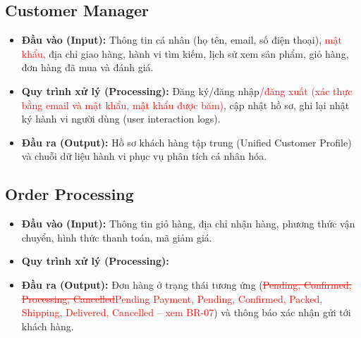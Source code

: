 \documentclass[12pt,a4paper,oneside]{report}
\newif\ifmark \marktrue
\newcommand{\chg}[1]{\ifmark\textcolor{red}{#1}\else #1\fi}
\newcommand{\del}[1]{\ifmark\textcolor{red}{\sout{#1}}\fi}
\begin{document}
\subsection{Customer Manager}

\begin{itemize}
  \item \textbf{Đầu vào (Input):} Thông tin cá nhân (họ tên, email, số điện thoại), \chg{mật khẩu, }địa chỉ giao hàng, hành vi tìm kiếm, lịch sử xem sản phẩm, giỏ hàng, đơn hàng đã mua và đánh giá.
  \item \textbf{Quy trình xử lý (Processing):} Đăng ký/đăng nhập\chg{/đăng xuất (xác thực bằng email và mật khẩu, mật khẩu được băm)}, cập nhật hồ sơ, ghi lại nhật ký hành vi người dùng (user interaction logs).
  \item \textbf{Đầu ra (Output):} Hồ sơ khách hàng tập trung (Unified Customer Profile) và chuỗi dữ liệu hành vi phục vụ phân tích cá nhân hóa.
\end{itemize}

\subsection{Order Processing}

\begin{itemize}
  \item \textbf{Đầu vào (Input):} Thông tin giỏ hàng, địa chỉ nhận hàng, phương thức vận chuyển, hình thức thanh toán, mã giảm giá.
  \item \textbf{Quy trình xử lý (Processing):}
  \item \textbf{Đầu ra (Output):} Đơn hàng ở trạng thái tương ứng (\del{Pending, Confirmed, Processing, Cancelled}\chg{Pending Payment, Pending, Confirmed, Packed, Shipping, Delivered, Cancelled -- xem BR-07}) và thông báo xác nhận gửi tới khách hàng.
\end{itemize}
\end{document}

